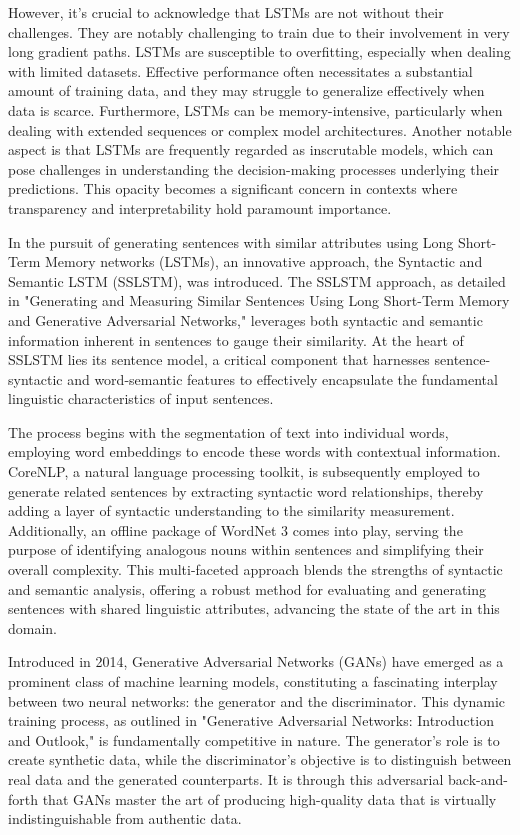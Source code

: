 \documentclass[conference]{IEEEtran}
\begin{document}
However, it's crucial to acknowledge that LSTMs are not without their challenges. They are notably challenging to train due to their involvement in very long gradient paths. LSTMs are susceptible to overfitting, especially when dealing with limited datasets. Effective performance often necessitates a substantial amount of training data, and they may struggle to generalize effectively when data is scarce. Furthermore, LSTMs can be memory-intensive, particularly when dealing with extended sequences or complex model architectures. Another notable aspect is that LSTMs are frequently regarded as inscrutable models, which can pose challenges in understanding the decision-making processes underlying their predictions. This opacity becomes a significant concern in contexts where transparency and interpretability hold paramount importance.



In the pursuit of generating sentences with similar attributes using Long Short-Term Memory networks (LSTMs), an innovative approach, the Syntactic and Semantic LSTM (SSLSTM), was introduced. The SSLSTM approach, as detailed in "Generating and Measuring Similar Sentences Using Long Short-Term Memory and Generative Adversarial Networks," leverages both syntactic and semantic information inherent in sentences to gauge their similarity. At the heart of SSLSTM lies its sentence model, a critical component that harnesses sentence-syntactic and word-semantic features to effectively encapsulate the fundamental linguistic characteristics of input sentences.


The process begins with the segmentation of text into individual words, employing word embeddings to encode these words with contextual information. CoreNLP, a natural language processing toolkit, is subsequently employed to generate related sentences by extracting syntactic word relationships, thereby adding a layer of syntactic understanding to the similarity measurement. Additionally, an offline package of WordNet 3 comes into play, serving the purpose of identifying analogous nouns within sentences and simplifying their overall complexity. This multi-faceted approach blends the strengths of syntactic and semantic analysis, offering a robust method for evaluating and generating sentences with shared linguistic attributes, advancing the state of the art in this domain.



Introduced in 2014, Generative Adversarial Networks (GANs) have emerged as a prominent class of machine learning models, constituting a fascinating interplay between two neural networks: the generator and the discriminator. This dynamic training process, as outlined in "Generative Adversarial Networks: Introduction and Outlook," is fundamentally competitive in nature. The generator's role is to create synthetic data, while the discriminator's objective is to distinguish between real data and the generated counterparts. It is through this adversarial back-and-forth that GANs master the art of producing high-quality data that is virtually indistinguishable from authentic data.
\end{document}
